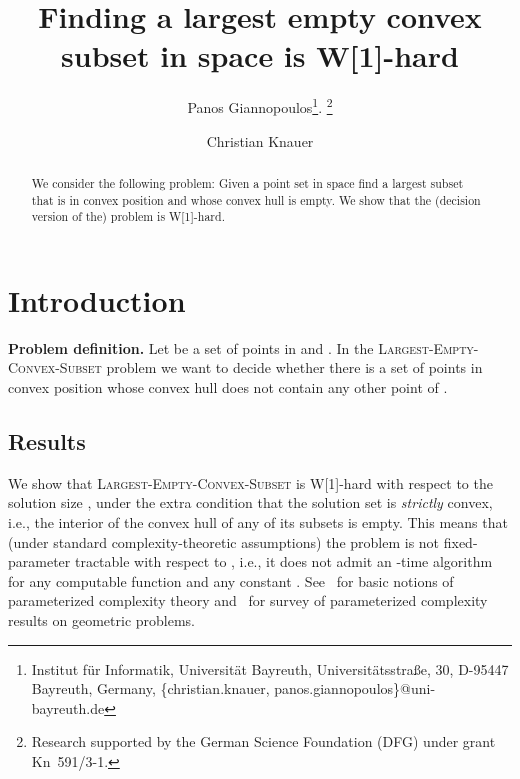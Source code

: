 \documentclass[11pt,a4paper]{article}
\begin{document}
\title{Finding a largest empty convex subset in space is W[1]-hard}

\author{Panos Giannopoulos\thanks{Institut f{\"u}r Informatik, Universit{\"a}t Bayreuth, 
			  \allowbreak Universi\-t{\"a}tsstra{\ss}e, 30, D-95447 Bayreuth, Germany,
			  \textsf \{christian.knauer, panos.giannopoulos\}@uni-bayreuth.de}.
\footnote{Research supported by the German Science Foundation (DFG) under grant Kn~591/3-1.}
\and
Christian Knauer\footnotemark[1]
}



\maketitle

\begin{abstract}
We consider the following problem: Given a point set in space find a largest subset that is in convex position and whose convex hull is empty. We show that the (decision version of the) problem is W[1]-hard.
\end{abstract}




\section{Introduction}
\label{sec:introduction}

\noindent
{\textbf {Problem definition.}} Let  be a set of  points in  and . In the \textsc{Largest-Empty-Convex-Subset} problem we want to decide whether there is a set  of  points in convex position whose convex hull does not contain any other point of .  

\subsection{Results}

We show that \textsc{Largest-Empty-Convex-Subset} is W[1]-hard with respect to the solution size , under the extra condition that the solution set is \emph{strictly} convex, i.e., the interior of the convex hull of any of its subsets is empty. This means that (under standard complexity-theoretic assumptions) the problem is not fixed-parameter tractable with respect to , i.e., it does not admit an -time algorithm for any computable function  and any constant . See~\cite{FG06} for basic notions of parameterized complexity theory and~\cite{GKW08}  for survey of parameterized complexity results on geometric problems.
\end{document}

